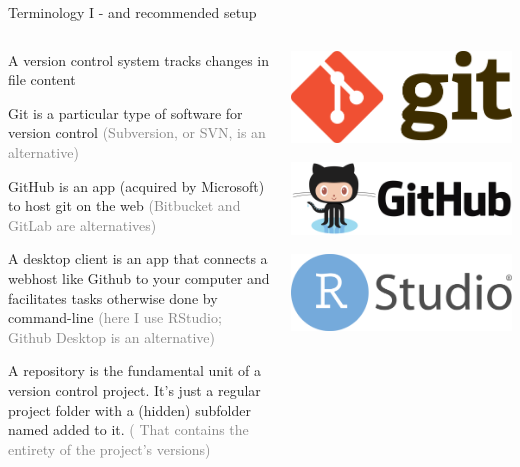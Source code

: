 \documentclass[ignorenonframetext, 10pt, aspectratio=169]{beamer}
\begin{document}
\begin{frame}{Terminology I  - and recommended setup}
\begin{columns}[T]
\begin{column}{0.65\textwidth}
\begin{wideitemize}
\item<1-> A version control system \alert{tracks} changes in file content
\item<2-> \alert{Git} is a particular type of software for version control \textcolor{gray}{(Subversion, or SVN, is an alternative)}
\item<3-> \alert{GitHub} is an app (acquired by Microsoft) to host git on the web \textcolor{gray}{(Bitbucket and GitLab are alternatives)}
\item<4-> A \alert{desktop client} is an app that connects a webhost like Github to your computer and facilitates tasks otherwise done by \alert{command-line} \textcolor{gray}{(here I use \alert{RStudio}; Github Desktop is an alternative)}
\item<5-> A \alert{repository} is the fundamental unit of a version control project. It's just a regular project folder with a (hidden) subfolder named  added to it. \textcolor{gray}{( That  contains the entirety of the project's versions)}  
\end{wideitemize}
\end{column}
\begin{column}{0.35\textwidth}
\centering
{}\includegraphics[width = 0.6\linewidth]{Git-Logo-2Color.png}

\bigskip
{}\includegraphics[width = 0.6\linewidth]{github-logo-1.png}

\bigskip
{}\includegraphics[width = 0.6\linewidth]{RStudio-Logo-Flat.png}


\end{column}
\end{columns}
\end{frame}
\end{document}
